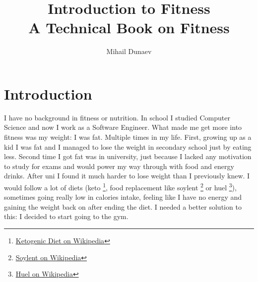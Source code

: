 \documentclass[openany, 12pt]{book}
\title{
  Introduction to Fitness \\
  \vskip 0.5cm
  \small A Technical Book on Fitness}
\author{Mihail Dunaev}
\date{}
\begin{document}
  \maketitle
  \tableofcontents

  \chapter{Introduction}
  
	I have no background in fitness or nutrition. In school I studied Computer Science and now I work as a Software Engineer. What made me get more 
	into fitness was my weight: I was fat. Multiple times in my life. First, growing up as a kid I was fat and I managed to lose the weight in 
	secondary school just by eating less. Second time I got fat was in university, just because I lacked any motivation to study for exams and would
	power my way through with food and energy drinks. After uni I found it much harder to lose weight than I previously knew. I would follow a lot  of diets (keto
        \footnote{\href{https://en.wikipedia.org/wiki/Ketogenic_diet}{Ketogenic Diet on Wikipedia}}, food replacement like soylent
        \footnote{\href{https://en.wikipedia.org/wiki/Soylent_(meal_replacement)}{Soylent on Wikipedia}} or huel
        \footnote{\href{https://en.wikipedia.org/wiki/Huel}{Huel on Wikipedia}}), sometimes going really low in calories intake, feeling like I 
	have no energy and gaining the weight back on after ending the diet. I needed a better solution to this: I decided to start going to the gym.
	
\end{document}
